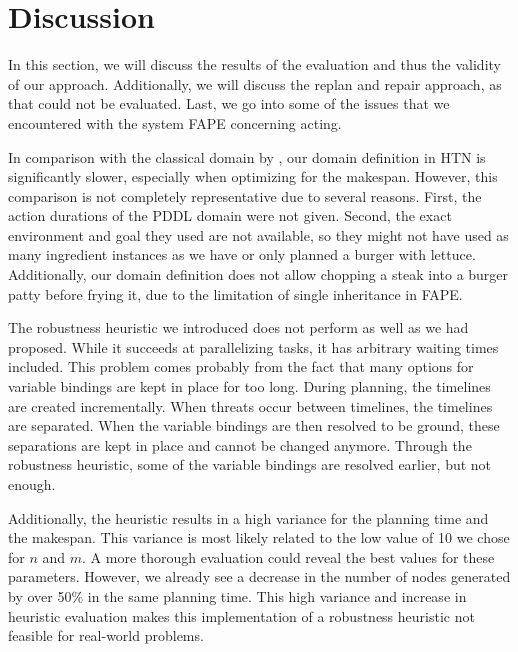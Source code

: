 \section{Discussion}\label{sec:discussion}

In this section, we will discuss the results of the evaluation and thus the validity of our approach.
Additionally, we will discuss the replan and repair approach, as that could not be evaluated. 
Last, we go into some of the issues that we encountered with the system FAPE concerning acting.



In comparison with the classical domain by \cite{yuxinliuPlanningOvercookedGame2020}, our domain definition in HTN is significantly slower, especially when optimizing for the makespan.
However, this comparison is not completely representative due to several reasons.
First, the action durations of the PDDL domain were not given.
Second, the exact environment and goal they used are not available, so they might not have used as many ingredient instances as we have or only planned a burger with lettuce.
Additionally, our domain definition does not allow chopping a steak into a burger patty before frying it, due to the limitation of single inheritance in FAPE.


The robustness heuristic we introduced does not perform as well as we had proposed.
While it succeeds at parallelizing tasks, it has arbitrary waiting times included.
This problem comes probably from the fact that many options for variable bindings are kept in place for too long.
During planning, the timelines are created incrementally.
When threats occur between timelines, the timelines are separated.
When the variable bindings are then resolved to be ground, these separations are kept in place and cannot be changed anymore.
Through the robustness heuristic, some of the variable bindings are resolved earlier, but not enough.

Additionally, the heuristic results in a high variance for the planning time and the makespan.
This variance is most likely related to the low value of 10 we chose for $n$ and $m$.
A more thorough evaluation could reveal the best values for these parameters.
However, we already see a decrease in the number of nodes generated by over 50\% in the same planning time.
This high variance and increase in heuristic evaluation makes this implementation of a robustness heuristic not feasible for real-world problems.

